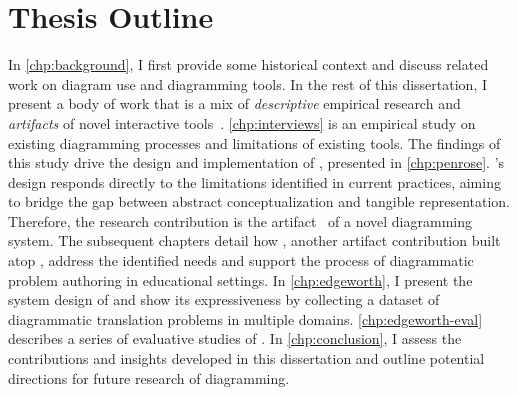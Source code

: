 \section{Thesis Outline}



In \cref{chp:background}, I first provide some historical context and discuss related work on diagram use and diagramming tools. In the rest of this dissertation, I present a body of work that is a mix of \textit{descriptive} empirical research and \textit{artifacts} of novel interactive tools~\cite{wobbrock_research_2016}.  \cref{chp:interviews} is an empirical study on existing diagramming processes and limitations of existing tools.
The findings of this study drive the design and implementation of \Penrose, presented in \cref{chp:penrose}. \Penrose's design responds directly to the limitations identified in current practices, aiming to bridge the gap between abstract conceptualization and tangible representation. Therefore, the research contribution is the artifact~\cite{wobbrock_research_2016} of a novel diagramming system. The subsequent chapters detail how \Edgeworth, another artifact contribution built atop \Penrose, address the identified needs and support the process of diagrammatic problem authoring in educational settings. In \cref{chp:edgeworth}, I present the system design of \Edgeworth and show its expressiveness by collecting a dataset of diagrammatic translation problems in multiple domains. \cref{chp:edgeworth-eval} describes a series of evaluative studies of \Edgeworth. In \cref{chp:conclusion}, I assess the contributions and insights developed in this dissertation and outline potential directions for future research of diagramming.
